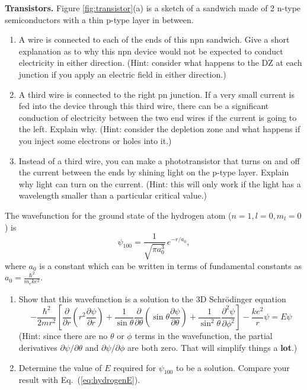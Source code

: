 
\begin{problem}
{\bf Transistors.} Figure \ref{fig:transistor}(a) is a sketch of a sandwich made of
2 n-type semiconductors with a thin p-type layer in between.
\begin{enumerate}
\item A wire is connected to each of the ends of this npn sandwich.
Give a short explanation as to why this npn device would not be
expected to conduct electricity in either direction. (Hint: consider what
happens to the DZ at each junction if you apply an electric field in either 
direction.)
\item A third wire is connected to the right pn junction. If
a very small current is fed into the device through this third wire,
there can be a significant conduction of electricity between the
two end wires if the current is going to the left. Explain why. 
(Hint: consider the depletion zone and
what happens if you inject some electrons or holes into it.)
\item Instead of a third wire, you can make a phototransistor that turns
on and off the current between the ends by shining light on the
p-type layer. Explain why light can turn on the current. (Hint: this
will only work if the light has a wavelength smaller than a particular
critical value.)
\end{enumerate}
\end{problem}


\newpage


\begin{problem}
  The wavefunction for the ground state of the hydrogen atom 
\hbox{($n=1, l=0, m_l=0$)} is 
\[ \psi_{100} = \frac{1}{\sqrt{\pi a_0^3}}\,  e^{-r/a_0}, \] 
where $a_0$ is a constant which can be written in terms of 
fundamental constants
as $a_0 = \frac{\hbar^2}{m_e k e^2}$.
\begin{enumerate}
\item Show that this wavefunction is a solution to the 3D
  Schr\"{o}dinger equation %
  \[ -\frac{\hbar^2}{2mr^2} \left[ \frac{\partial}{\partial r} \left(
      r^2 \frac{\partial \psi}{\partial r} \right) +
    \frac{1}{\sin{\theta}} \frac{\partial}{\partial \theta} \left(
      \sin{\theta} \frac{\partial \psi}{\partial \theta} \right) +
    \frac{1}{\sin^2{\theta}} \frac{\partial^2 \psi}{\partial \phi^2}
  \right] - \frac{k e^2}{r} \psi = E \psi \]
(Hint: since there are no $\theta$ or $\phi$ terms in the wavefunction,
the partial derivatives $\partial \psi/\partial \theta$ and 
$\partial \psi/\partial \phi$
are both zero. That will simplify things a {\bf lot}.)

\item Determine the value of $E$ required for $\psi_{100}$ to be a
  solution.  Compare your result with Eq.~(\ref{eq:hydrogenE}).
\end{enumerate}
\end{problem}

